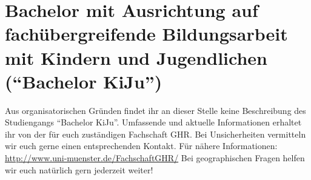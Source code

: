 \chapter*{Bachelor mit Ausrichtung auf fachübergreifende Bildungsarbeit mit Kindern und Jugendlichen ("`Bachelor KiJu"')}
Aus organisatorischen Gründen findet ihr an dieser Stelle keine Beschreibung des Studiengangs "`Bachelor KiJu"'. Umfassende und aktuelle Informationen erhaltet ihr von der für euch zuständigen Fachschaft GHR. Bei Unsicherheiten vermitteln wir euch gerne einen entsprechenden Kontakt. Für nähere Informationen:\\
\url{http://www.uni-muenster.de/FachschaftGHR/}
Bei geographischen Fragen helfen wir euch natürlich gern jederzeit weiter!


